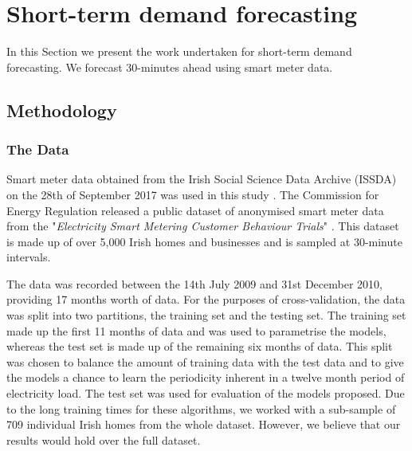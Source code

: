 \section{Short-term demand forecasting}
\label{forecast:sec:shortterm}


In this Section we present the work undertaken for short-term demand forecasting. We forecast 30-minutes ahead using smart meter data. 

\subsection{Methodology}
\subsubsection{The Data}


Smart meter data obtained from the Irish Social Science Data Archive (ISSDA) on the 28th of September 2017 was used in this study \cite{cer_2012}. The Commission for Energy Regulation released a public dataset of anonymised smart meter data from the "\textit{Electricity Smart Metering Customer Behaviour Trials}" \cite{cer_2012}. This dataset is made up of over 5,000 Irish homes and businesses and is sampled at 30-minute intervals.

The data was recorded between the 14th July 2009 and 31st December 2010, providing 17 months worth of data. For the purposes of cross-validation, the data was split into two partitions, the training set and the testing set. The training set made up the first 11 months of data and was used to parametrise the models, whereas the test set is made up of the remaining six months of data. This split was chosen to balance the amount of training data with the test data and to give the models a chance to learn the periodicity inherent in a twelve month period of electricity load. The test set was used for evaluation of the models proposed. Due to the long training times for these algorithms, we worked with a sub-sample of 709 individual Irish homes from the whole dataset. However, we believe that our results would hold over the full dataset.

